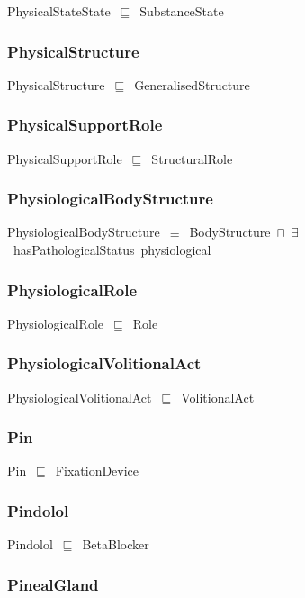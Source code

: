 \documentclass{article}
\begin{document}
PhysicalStateState~\ensuremath{\sqsubseteq}~SubstanceState~

\subsubsection*{PhysicalStructure}

PhysicalStructure~\ensuremath{\sqsubseteq}~GeneralisedStructure~

\subsubsection*{PhysicalSupportRole}

PhysicalSupportRole~\ensuremath{\sqsubseteq}~StructuralRole~

\subsubsection*{PhysiologicalBodyStructure}

PhysiologicalBodyStructure~\ensuremath{\equiv}~BodyStructure~\ensuremath{\sqcap}~\ensuremath{\exists}~hasPathologicalStatus~physiological

\subsubsection*{PhysiologicalRole}

PhysiologicalRole~\ensuremath{\sqsubseteq}~Role~

\subsubsection*{PhysiologicalVolitionalAct}

PhysiologicalVolitionalAct~\ensuremath{\sqsubseteq}~VolitionalAct~

\subsubsection*{Pin}

Pin~\ensuremath{\sqsubseteq}~FixationDevice~

\subsubsection*{Pindolol}

Pindolol~\ensuremath{\sqsubseteq}~BetaBlocker~

\subsubsection*{PinealGland}
\end{document}
